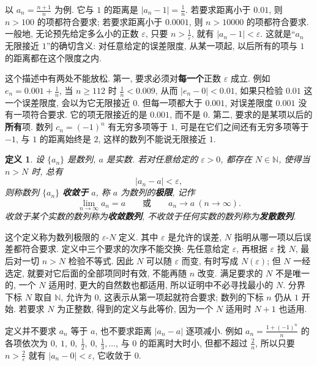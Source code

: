 \documentclass[UTF8,openany]{ctexbook}
\theoremstyle{chinesetextbook}
\newtheorem{definition}{定义}[section]
\begin{document}
以 $\displaystyle a_n=\frac{n+1}n$ 为例. 它与 $1$ 的距离是 $\displaystyle|a_n-1|=\frac1n$. 若要求距离小于 $0.01$, 则 $n>100$ 的项都符合要求; 若要求距离小于 $0.0001$, 则 $n>10000$ 的项都符合要求. 一般地, 无论预先给定多么小的正数 $\varepsilon$, 只要 $\displaystyle n>\frac1\varepsilon$, 就有 $|a_n-1|<\varepsilon$. 这就是“$a_n$ 无限接近 $1$”的确切含义: 对任意给定的误差限度, 从某一项起, 以后所有的项与 $1$ 的距离都在这个限度之内.

这个描述中有两处不能放松. 第一, 要求必须对\textbf{每一个}正数 $\varepsilon$ 成立. 例如 $\displaystyle e_n=0.001+\frac1n$, 当 $n\ge112$ 时 $\displaystyle\frac1n<0.009$, 从而 $|e_n-0|<0.01$, 如果只检验 $0.01$ 这一个误差限度, 会以为它无限接近 $0$. 但每一项都大于 $0.001$, 对误差限度 $0.001$ 没有一项符合要求. 它的项无限接近的是 $0.001$, 而不是 $0$. 第二, 要求的是某项以后的\textbf{所有}项. 数列 $c_n=(-1)^n$ 有无穷多项等于 $1$, 可是在它们之间还有无穷多项等于 $-1$, 与 $1$ 的距离始终是 $2$, 这样的数列不能说无限接近 $1$.
\begin{definition}
设 $\{a_n\}$ 是数列, $a$ 是实数. 若对任意给定的 $\varepsilon>0$, 都存在 $N\in\mathbb N$, 使得当 $n>N$ 时, 总有
\[
|a_n-a|<\varepsilon,
\]
则称数列 $\{a_n\}$ \textbf{收敛于} $a$, 称 $a$ 为数列的\textbf{极限}, 记作
\[
\lim_{n\to\infty}a_n=a\qquad\text{或}\qquad a_n\to a\ (n\to\infty).
\]
收敛于某个实数的数列称为\textbf{收敛数列}, 不收敛于任何实数的数列称为\textbf{发散数列}.
\end{definition}
这个定义称为数列极限的 $\varepsilon$-$N$ 定义. 其中 $\varepsilon$ 是允许的误差, $N$ 指明从哪一项以后误差都符合要求. 定义中三个要求的次序不能交换: 先任意给定 $\varepsilon$, 再根据 $\varepsilon$ 找 $N$, 最后对一切 $n>N$ 检验不等式. 因此 $N$ 可以随 $\varepsilon$ 而变, 有时写成 $N(\varepsilon)$; 但 $N$ 一经选定, 就要对它后面的全部项同时有效, 不能再随 $n$ 改变. 满足要求的 $N$ 不是唯一的, 一个 $N$ 适用时, 更大的自然数也都适用, 所以证明中不必寻找最小的 $N$. 分界下标 $N$ 取自 $\mathbb N$, 允许为 $0$, 这表示从第一项起就符合要求; 数列的下标 $n$ 仍从 $1$ 开始. 若要求 $N$ 为正整数, 得到的定义与此等价, 因为一个 $N$ 适用时 $N+1$ 也适用.

定义并不要求 $a_n$ 等于 $a$, 也不要求距离 $|a_n-a|$ 逐项减小. 例如 $\displaystyle a_n=\frac{1+(-1)^n}n$ 的各项依次为 $\displaystyle0,\ 1,\ 0,\ \frac12,\ 0,\ \frac13,\ldots$, 与 $0$ 的距离时大时小, 但都不超过 $\displaystyle\frac2n$, 所以只要 $\displaystyle n>\frac2\varepsilon$ 就有 $|a_n-0|<\varepsilon$, 它收敛于 $0$.
\end{document}
